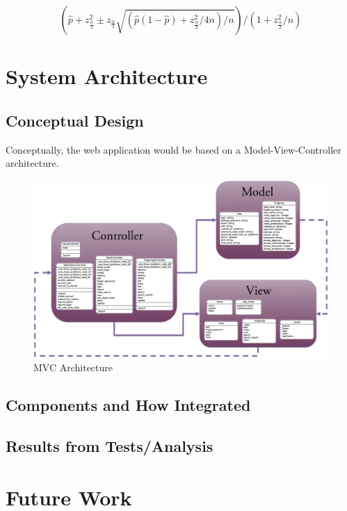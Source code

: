\documentclass[12pt,english]{article}
\begin{document}
\[
(\hat{p}+z_{\frac{\alpha}{2}}^{2}\pm z_{\frac{\alpha}{2}}\sqrt{(\hat{p}(1-\hat{p})+z_{\frac{\alpha}{2}}^{2}/4n)/n})/(1+z_{\frac{\alpha}{2}}^{2}/n)
\]



\section{System Architecture}


\subsection{Conceptual Design}

Conceptually, the web application would be based on a Model-View-Controller
architecture.

\begin{figure}[H]
 \caption{MVC Architecture}


\includegraphics[scale=0.15]{MVC} 
\end{figure}



\subsection{Components and How Integrated}


\subsection{Results from Tests/Analysis}


\section{Future Work}
\end{document}
